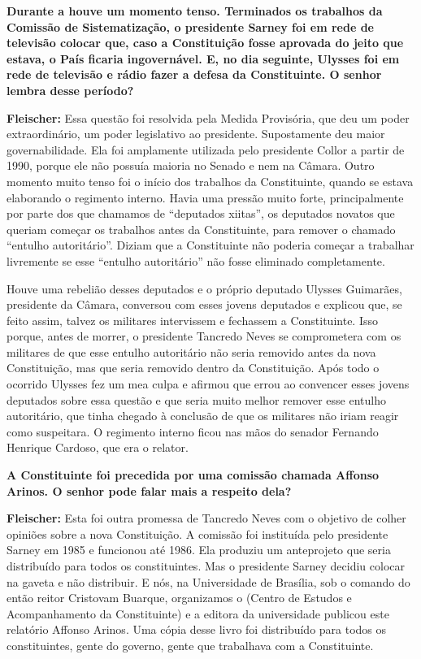 \textbf{Durante a  houve um momento tenso. Terminados os trabalhos da
Comissão de Sistematização, o presidente Sarney foi em rede de televisão
colocar que, caso a Constituição fosse aprovada do jeito que estava, o
País ficaria ingovernável. E, no dia seguinte, Ulysses foi em rede de
televisão e rádio fazer a defesa da Constituinte. O senhor lembra desse
período?}

\textbf{Fleischer:} Essa questão foi resolvida pela Medida Provisória,
que deu um poder extraordinário, um poder legislativo ao presidente.
Supostamente deu maior governabilidade. Ela foi amplamente utilizada
pelo presidente Collor a partir de 1990, porque ele não possuía maioria
no Senado e nem na Câmara. Outro momento muito tenso foi o início dos
trabalhos da Constituinte, quando se estava elaborando o regimento
interno. Havia uma pressão muito forte, principalmente por parte dos que
chamamos de ``deputados xiitas'', os deputados novatos que queriam
começar os trabalhos antes da Constituinte, para remover o chamado
``entulho autoritário''. Diziam que a Constituinte não poderia começar a
trabalhar livremente se esse ``entulho autoritário'' não fosse eliminado
completamente.

Houve uma rebelião desses deputados e o próprio deputado Ulysses
Guimarães, presidente da Câmara, conversou com esses jovens deputados e
explicou que, se feito assim, talvez os militares intervissem e
fechassem a Constituinte. Isso porque, antes de morrer, o presidente
Tancredo Neves se comprometera com os militares de que esse entulho
autoritário não seria removido antes da nova Constituição, mas que seria
removido dentro da Constituição. Após todo o ocorrido Ulysses fez um mea
culpa e afirmou que errou ao convencer esses jovens deputados sobre essa
questão e que seria muito melhor remover esse entulho autoritário, que
tinha chegado à conclusão de que os militares não iriam reagir como
suspeitara. O regimento interno ficou nas mãos do senador Fernando
Henrique Cardoso, que era o relator.

\textbf{A Constituinte foi precedida por uma comissão chamada Affonso
Arinos. O senhor pode falar mais a respeito dela?}

\textbf{Fleischer:} Esta foi outra promessa de Tancredo Neves com o
objetivo de colher opiniões sobre a nova Constituição. A comissão foi
instituída pelo presidente Sarney em 1985 e funcionou até 1986. Ela
produziu um anteprojeto que seria distribuído para todos os
constituintes. Mas o presidente Sarney decidiu colocar na gaveta e não
distribuir. E nós, na Universidade de Brasília, sob o comando do então
reitor Cristovam Buarque, organizamos o  (Centro de Estudos e
Acompanhamento da Constituinte) e a editora da universidade publicou
este relatório Affonso Arinos. Uma cópia desse livro foi distribuído
para todos os constituintes, gente do governo, gente que trabalhava com
a Constituinte.

